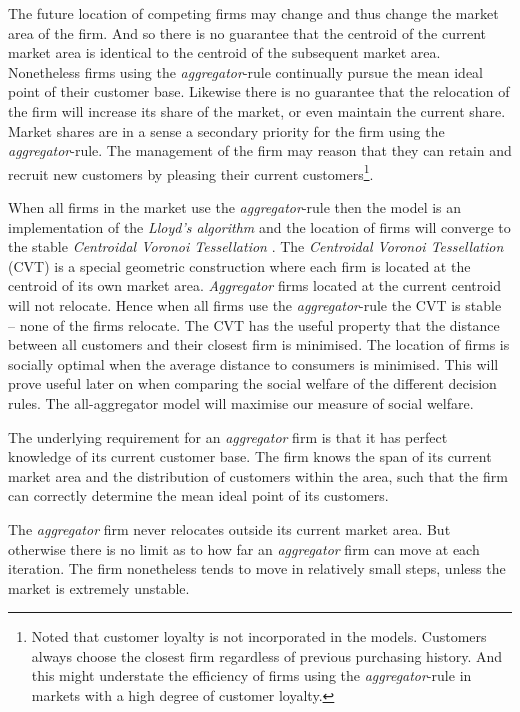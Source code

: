 \documentclass[preprint, 12pt]{elsarticle}
\begin{document}
The future location of competing firms may change and thus change the market area of the firm. And so there is no guarantee that the centroid of the current market area is identical to the centroid of the subsequent market area. Nonetheless firms using the \emph{aggregator}-rule continually pursue the mean ideal point of their customer base. Likewise there is no guarantee that the relocation of the firm will increase its share of the market, or even maintain the current share. Market shares are in a sense a secondary priority for the firm using the \emph{aggregator}-rule. The management of the firm may reason that they can retain and recruit new customers by pleasing their current customers\footnote{Noted that customer loyalty is not incorporated in the models. Customers always choose the closest firm regardless of previous purchasing history. And this might understate the efficiency of firms using the \emph{aggregator}-rule in markets with a high degree of customer loyalty.}.

When all firms in the market use the \emph{aggregator}-rule then the model is an implementation of the \emph{Lloyd's algorithm} and the location of firms will converge to the stable \emph{Centroidal Voronoi Tessellation} \citep[chapter~3, pp.~48-49]{Laver_Sergenti_2011}. The \emph{Centroidal Voronoi Tessellation} (CVT) is a special geometric construction where each firm is located at the centroid of its own market area. \emph{Aggregator} firms located at the current centroid will not relocate. Hence when all firms use the \emph{aggregator}-rule the CVT is stable -- none of the firms relocate. The CVT has the useful property that the distance between all customers and their closest firm is minimised. The location of firms is socially optimal when the average distance to consumers is minimised. This will prove useful later on when comparing the social welfare of the different decision rules. The all-aggregator model will maximise our measure of social welfare.

The underlying requirement for an \emph{aggregator} firm is that it has perfect knowledge of its current customer base. The firm knows the span of its current market area and the distribution of customers within the area, such that the firm can correctly determine the mean ideal point of its customers.

The \emph{aggregator} firm never relocates outside its current market area. But otherwise there is no limit as to how far an \emph{aggregator} firm can move at each iteration. The firm nonetheless tends to move in relatively small steps, unless the market is extremely unstable. 
\end{document}
